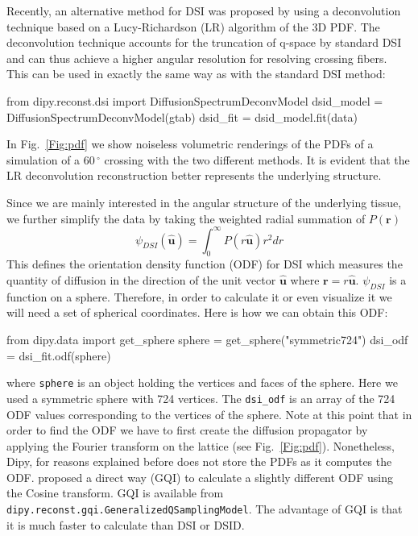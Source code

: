 \documentclass{bioinfo}
\begin{document}
Recently, an alternative method for DSI was proposed by
\citet{canales-rodriguez-etal:10} using a deconvolution technique
based on a Lucy-Richardson (LR) algorithm of the 3D PDF. The
deconvolution technique accounts for the truncation of q-space by
standard DSI and can thus achieve a higher angular resolution for
resolving crossing fibers. This can be used in exactly the same way as
with the standard DSI method:
\begin{python}
from dipy.reconst.dsi import
                      DiffusionSpectrumDeconvModel
dsid_model = DiffusionSpectrumDeconvModel(gtab)
dsid_fit = dsid_model.fit(data)
\end{python}

In Fig.~\ref{Fig:pdf} we show noiseless volumetric renderings of the PDFs of
a simulation of a $60\,^{\circ}$ crossing with the two different methods. It
is evident that the LR deconvolution reconstruction better represents the
underlying structure.

Since we are mainly interested in the angular structure of the underlying
tissue, we further simplify the data by taking the weighted radial summation of
$P(\mathbf{r})$
\begin{equation}
\psi_{DSI}(\hat{\mathbf{u}})=\int_{0}^{\infty}P(r\hat{\mathbf{u}})r^{2}dr\label{eq:ODF_DSI}
\end{equation}
\noindent This defines the orientation density function (ODF) for DSI which
measures the quantity of diffusion in the direction of the unit vector
$\mathbf{\hat{u}}$ where $\mathbf{r=}r\hat{\mathbf{u}}$. $\psi_{DSI}$ is a
function on a sphere. Therefore, in order to calculate it or even visualize it
we will need a set of spherical coordinates. Here is how we can obtain this ODF:
\begin{python}
from dipy.data import get_sphere
sphere = get_sphere("symmetric724")
dsi_odf = dsi_fit.odf(sphere)
\end{python}
where \texttt{sphere} is an object holding the vertices and faces of the
sphere. Here we used a symmetric sphere with 724 vertices. The
\texttt{dsi\_odf} is an array of the 724 ODF values corresponding to the
vertices of the sphere. Note at this point that in order to find the ODF we
have to first create the diffusion propagator by applying the Fourier transform
on the lattice (see Fig.~\ref{Fig:pdf}). Nonetheless, Dipy, for reasons explained before does not store
the PDFs as it computes the ODF. \cite{yeh-etal:10} proposed a direct way (GQI) to
calculate a slightly different ODF using the Cosine transform. GQI is
available from \texttt{dipy.reconst.gqi.GeneralizedQSamplingModel}. The
advantage of GQI is that it is much faster to calculate than DSI or DSID.
\end{document}
